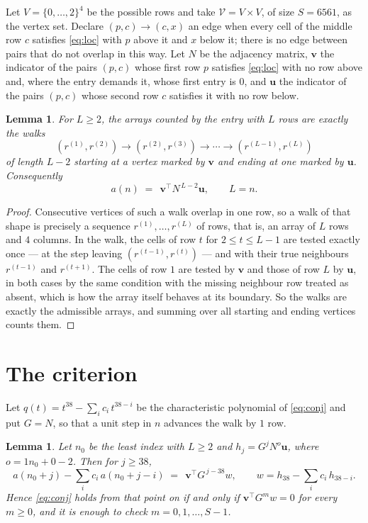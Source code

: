 \documentclass[11pt,a4paper]{article}
\theoremstyle{plain}
\newtheorem{lemma}[theorem]{Lemma}
\theoremstyle{definition}
\begin{document}
Let $V=\{0,\dots,2\}^{4}$ be the possible rows and take
$\mathcal V=V\times V$, of size $S=6561$, as the vertex set. Declare $(p,c)\to(c,x)$ an edge
when every cell of the middle row $c$ satisfies \eqref{eq:loc} with $p$ above it and $x$
below it; there is no edge between pairs that do not overlap in this way. Let $N$ be the
adjacency matrix, $\mathbf{v}$ the indicator of the pairs $(p,c)$ whose first row $p$
satisfies \eqref{eq:loc} with no row above and, where the entry demands it, whose first entry is $0$, and $\mathbf{u}$ the indicator of
the pairs $(p,c)$ whose second row $c$ satisfies it with no row below.

\begin{lemma}\label{lem:walk}
For $L\ge2$, the arrays counted by the entry with $L$ rows are exactly the walks
\[
(r^{(1)},r^{(2)})\to(r^{(2)},r^{(3)})\to\cdots\to(r^{(L-1)},r^{(L)})
\]
of length $L-2$ starting at a vertex marked by $\mathbf{v}$ and ending at one marked by
$\mathbf{u}$. Consequently
\[
a(n)\;=\;\,\mathbf{v}^{\!\top}N^{\,L-2}\mathbf{u},\qquad L=n .
\]
\end{lemma}

\begin{proof}
Consecutive vertices of such a walk overlap in one row, so a walk of that shape is
precisely a sequence $r^{(1)},\dots,r^{(L)}$ of rows, that is, an array of $L$ rows
and $4$ columns. In the walk, the cells of row $t$ for $2\le t\le L-1$ are tested
exactly once --- at the step leaving $(r^{(t-1)},r^{(t)})$ --- and with their true
neighbours $r^{(t-1)}$ and $r^{(t+1)}$. The cells of row $1$ are tested by
$\mathbf{v}$ and those of row $L$ by $\mathbf{u}$, in both cases by the same condition
with the missing neighbour row treated as absent, which is how the array itself behaves at
its boundary. So the walks are exactly the admissible arrays, and summing over all starting
and ending vertices counts them.
\end{proof}

\section{The criterion}

Let $q(t)=t^{38}-\sum_i c_i\,t^{38-i}$ be the characteristic polynomial of
\eqref{eq:conj} and put $G=N$, so that a unit step in $n$ advances the walk by
$1$ row.

\begin{lemma}\label{lem:crit}
Let $n_0$ be the least index with $L\ge2$ and $h_j=G^{j}N^{o}\mathbf{u}$, where
$o=1n_0+0-2$. Then for $j\ge38$,
\[
a(n_0+j)-\sum_i c_i\,a(n_0+j-i)\;=\;\,\mathbf{v}^{\!\top}G^{\,j-38}w,
\qquad w=h_{38}-\sum_i c_i\,h_{38-i} .
\]
Hence \eqref{eq:conj} holds from that point on if and only if
$\mathbf{v}^{\!\top}G^{m}w=0$ for every $m\ge0$, and it is enough to check
$m=0,1,\dots,S-1$.
\end{lemma}
\end{document}
